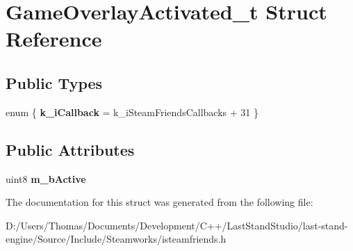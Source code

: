 \hypertarget{structGameOverlayActivated__t}{}\section{Game\+Overlay\+Activated\+\_\+t Struct Reference}
\label{structGameOverlayActivated__t}
\subsection*{Public Types}
\begin{DoxyCompactItemize}
\item 
\hypertarget{structGameOverlayActivated__t_a37d7b3a5b7632650f17eadb875d92093}{}enum \{ {\bfseries k\+\_\+i\+Callback} = k\+\_\+i\+Steam\+Friends\+Callbacks + 31
 \}\label{structGameOverlayActivated__t_a37d7b3a5b7632650f17eadb875d92093}

\end{DoxyCompactItemize}
\subsection*{Public Attributes}
\begin{DoxyCompactItemize}
\item 
\hypertarget{structGameOverlayActivated__t_abff1568c9d4951240009667c4da5d219}{}uint8 {\bfseries m\+\_\+b\+Active}\label{structGameOverlayActivated__t_abff1568c9d4951240009667c4da5d219}

\end{DoxyCompactItemize}


The documentation for this struct was generated from the following file\+:\begin{DoxyCompactItemize}
\item 
D\+:/\+Users/\+Thomas/\+Documents/\+Development/\+C++/\+Last\+Stand\+Studio/last-\/stand-\/engine/\+Source/\+Include/\+Steamworks/isteamfriends.\+h\end{DoxyCompactItemize}
